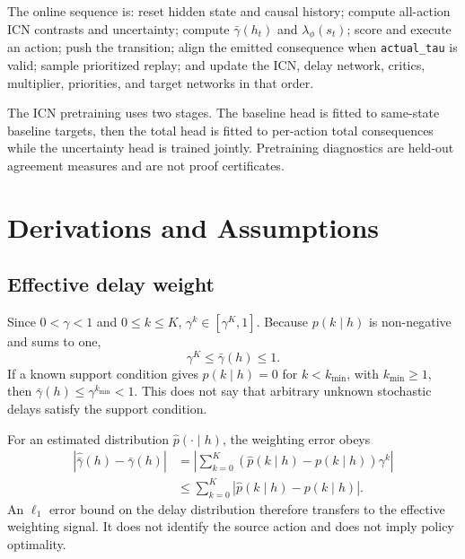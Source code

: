 \documentclass[10pt]{article}
\begin{document}
The online sequence is: reset hidden state and causal history; compute
all-action ICN contrasts and uncertainty; compute $\bar\gamma(h_t)$ and
$\lambda_\phi(s_t)$; score and execute an action; push the transition; align
the emitted consequence when \texttt{actual\_tau} is valid; sample prioritized replay;
and update the ICN, delay network, critics, multiplier, priorities, and target
networks in that order.

The ICN pretraining uses two stages. The baseline head is fitted to same-state
baseline targets, then the total head is fitted to per-action total
consequences while the uncertainty head is trained jointly. Pretraining
diagnostics are held-out agreement measures and are not proof certificates.

\section{Derivations and Assumptions}
\subsection{Effective delay weight}
Since $0<\gamma<1$ and $0\le k\le K$, $\gamma^k\in[\gamma^K,1]$.
Because $p(k\mid h)$ is non-negative and sums to one,
\begin{equation}
\gamma^K\le\bar\gamma(h)\le1.
\end{equation}
If a known support condition gives $p(k\mid h)=0$ for $k<k_{\min}$, with
$k_{\min}\ge1$, then $\bar\gamma(h)\le\gamma^{k_{\min}}<1$. This does not
say that arbitrary unknown stochastic delays satisfy the support condition.

For an estimated distribution $\widehat p(\cdot\mid h)$, the weighting error
obeys
\begin{align}
\left|\widehat{\bar\gamma}(h)-\bar\gamma(h)\right|
&=\left|\sum_{k=0}^{K}(\widehat p(k\mid h)-p(k\mid h))\gamma^k\right|\\
&\le \sum_{k=0}^{K}|\widehat p(k\mid h)-p(k\mid h)|.
\end{align}
An $\ell_1$ error bound on the delay distribution therefore transfers to the
effective weighting signal. It does not identify the source action and does
not imply policy optimality.
\end{document}
